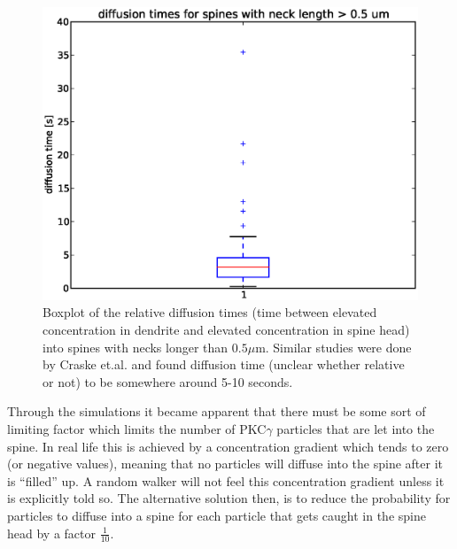\begin{figure}[h]
 \centering
 \includegraphics[scale=0.5]{Figures/spine_stats_boxplot_reltime_longneck.eps}
 \caption[Diffusion time for long necked spines]{Boxplot of the relative diffusion times (time between elevated concentration in dendrite and elevated concentration in spine head) into spines with necks longer than $0.5\mu$m. Similar studies were done by Craske et.al. and found diffusion time (unclear whether relative or not) to be somewhere around 5-10 seconds.}
 \label{results:boxplot_relative_diffusiontime_long_neck}
\end{figure}

Through the simulations it became apparent that there must be some sort of limiting factor which limits the number of PKC$\gamma$ particles that are let into the spine. 
In real life this is achieved by a concentration gradient which tends to zero (or negative values), meaning that no particles will diffuse into the spine after it is ``filled'' up. 
A random walker will not feel this concentration gradient unless it is explicitly told so. 
The alternative solution then, is to reduce the probability for particles to diffuse into a spine for each particle that gets caught in the spine head by a factor $\frac{1}{10}$. 